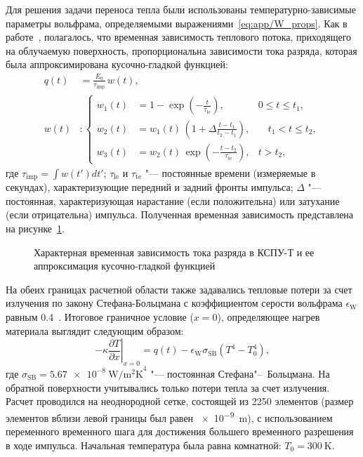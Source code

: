 Для решения задачи переноса тепла были использованы температурно-зависимые параметры вольфрама, определяемыми выражениями~\cref{eq:app/W_props}. Как в работе~\cite{Poskakalov2020}, полагалось, что временная зависимость теплового потока, приходящего на облучаемую поверхность, пропорциональна зависимости тока разряда, которая была аппроксимирована кусочно-гладкой функцией:
\begin{subequations}
	\label{eq:ch3/pulse_form}
	\begin{align}
		q(t) & =\frac{E_0}{\tau_\mathrm{imp}} \, w(t), \\
		w(t) & : \left\{
		\begin{alignedat}{2}
			w_1(t) & = 1 - \exp \left( -\frac{t}{\tau_\mathrm{le}} \right), & 0 \leq t \leq t_1, \\
			w_2(t) & = w_1(t) \, \left( 1 + \Delta \frac{t-t_1}{t_2 - t_1} \right), & \quad t_1 < t \leq t_2, \\
			w_3(t) & = w_2(t) \, \exp \left( -\frac{t-t_2}{\tau_\mathrm{te}} \right), & t > t_2,
		\end{alignedat}
		\right.
	\end{align}
\end{subequations}
где \( \tau_\mathrm{imp}=\int w(t')dt' \);  \( \tau_\mathrm{le}\) и \( \tau_\mathrm{te}\) "--- постоянные времени (измеряемые в секундах), характеризующие передний и задний фронты импульса; \( \Delta \) "--- постоянная, характеризующая нарастание (если положительна) или затухание (если отрицательна) импульса. Полученная временная зависимость представлена на рисунке~\cref{fig:ch3/QSPA_pulse}.
\begin{figure}[ht]
	\caption{Характерная временная зависимость тока разряда в КСПУ-Т и ее аппроксимация кусочно-гладкой функцией}\label{fig:ch3/QSPA_pulse}
\end{figure}
На обеих границах расчетной области также задавались тепловые потери за счет излучения по закону Стефана-Больцмана с коэффициентом серости вольфрама \( \epsilon_\mathrm{W} \) равным \num{0.4}~\cite{weast1975crc}. Итоговое граничное условие (\( x=0 \)), определяющее нагрев материала выглядит следующим образом:
\begin{equation}
	-\kappa \left. \frac{\partial T}{\partial x} \right\vert_{x=0} = q(t) - \epsilon_\mathrm{W} \sigma_\mathrm{SB} (T^4-T_0^4),
\end{equation}
где \( \sigma_\mathrm{SB} = \SI{5.67e-8}{\watt\per\meter\squared\kelvin}^{4} \) "--- постоянная Стефана"--~Больцмана. На обратной поверхности учитывались только потери тепла за счет излучения. Расчет проводился на неоднородной сетке, состоящей из \num{2250} элементов (размер элементов вблизи левой границы был равен \SI{e-9}{\meter}), с использованием переменного временного шага для достижения большего временного разрешения в ходе импульса. Начальная температура была равна комнатной: \( T_0 = \SI{300}{\kelvin} \).

